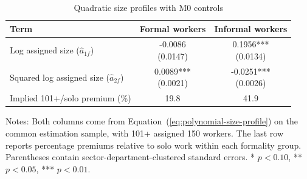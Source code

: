 \begin{table}[htbp]
  \centering
  \caption{Quadratic size profiles with M0 controls}
  \label{tab:polynomial-size-profile}
  \small
  \begin{tabular}{lcc}
    \toprule
    Term & Formal workers & Informal workers \\[0.25em]
    \midrule
    Log assigned size ($\widehat{a}_{1f}$) & \shortstack{-0.0086\\{\scriptsize (0.0147)}} & \shortstack{0.1956***\\{\scriptsize (0.0134)}} \\[0.25em]
    Squared log assigned size ($\widehat{a}_{2f}$) & \shortstack{0.0089***\\{\scriptsize (0.0021)}} & \shortstack{-0.0251***\\{\scriptsize (0.0026)}} \\[0.25em]
    \midrule
    Implied 101+/solo premium (\%) & 19.8 & 41.9 \\[0.25em]
    \bottomrule
  \end{tabular}
  \vspace{0.3em}
  \begin{minipage}{0.95\textwidth}
  \footnotesize
  Notes: Both columns come from Equation~(\ref{eq:polynomial-size-profile}) on the common estimation sample, with 101+ assigned 150 workers. The last row reports percentage premiums relative to solo work within each formality group. Parentheses contain sector-department-clustered standard errors. * $p<0.10$, ** $p<0.05$, *** $p<0.01$.
  \end{minipage}
\end{table}
